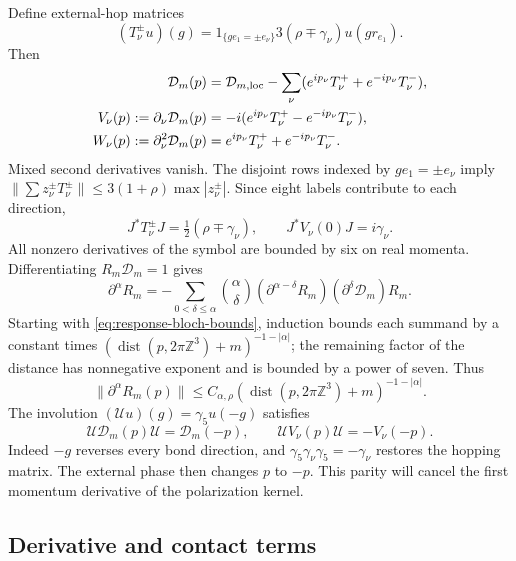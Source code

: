 \documentclass[11pt,letterpaper,reqno]{amsart}
\newcommand{\Z}{\mathbb Z}
\begin{document}
Define external-hop matrices
\[
 (T_\nu^\pm u)(g)=1_{\{ge_1=\pm e_\nu\}}
                          3(\rho\mp\gamma_\nu)u(gr_{e_1}).
\]
Then
\begin{align}\label{eq:response-symbol-vertices}
 \mathcal D_m(p)&=\mathcal D_{m,\mathrm{loc}}
       -\sum_\nu(e^{ip_\nu}T_\nu^++e^{-ip_\nu}T_\nu^-),\notag\\
 V_\nu(p):=\partial_\nu\mathcal D_m(p)
       &=-i(e^{ip_\nu}T_\nu^+-e^{-ip_\nu}T_\nu^-),\notag\\
 W_\nu(p):=\partial_\nu^2\mathcal D_m(p)
       &=e^{ip_\nu}T_\nu^++e^{-ip_\nu}T_\nu^-.
\end{align}
Mixed second derivatives vanish. The disjoint rows indexed
by $ge_1=\pm e_\nu$ imply
$\|\sum z_\nu^\pm T_\nu^\pm\|\le3(1+\rho)\max|z_\nu^\pm|$.
Since eight labels contribute to each direction,
\begin{equation}\label{eq:response-light-vertex}
 J^*T_\nu^\pm J=\tfrac12(\rho\mp\gamma_\nu),\qquad
 J^*V_\nu(0)J=i\gamma_\nu.
\end{equation}
All nonzero derivatives of the symbol are bounded by six
on real momenta. Differentiating $R_m\mathcal D_m=1$ gives
\[
 \partial^\alpha R_m=-\sum_{0<\delta\le\alpha}
   \binom\alpha\delta(\partial^{\alpha-\delta}R_m)
                    (\partial^\delta\mathcal D_m)R_m.
\]
Starting with \eqref{eq:response-bloch-bounds}, induction bounds
each summand by a constant times
$(\operatorname{dist}(p,2\pi\Z^3)+m)^{-1-|\alpha|}$;
the remaining factor of the distance has nonnegative exponent
and is bounded by a power of seven. Thus
\begin{equation}\label{eq:response-inverse-derivatives}
 \|\partial^\alpha R_m(p)\|
   \le C_{\alpha,\rho}
       (\operatorname{dist}(p,2\pi\Z^3)+m)^{-1-|\alpha|}.
\end{equation}
The involution $(\mathcal Uu)(g)=\gamma_5u(-g)$ satisfies
\begin{equation}\label{eq:response-bloch-parity}
 \mathcal U\mathcal D_m(p)\mathcal U=\mathcal D_m(-p),\qquad
 \mathcal UV_\nu(p)\mathcal U=-V_\nu(-p).
\end{equation}
Indeed $-g$ reverses every bond direction, and
$\gamma_5\gamma_\nu\gamma_5=-\gamma_\nu$ restores the
hopping matrix. The external phase then changes $p$ to
$-p$. This parity will cancel the first momentum derivative
of the polarization kernel.

\subsection{Derivative and contact terms}\label{subsec:response-contact}
\end{document}
